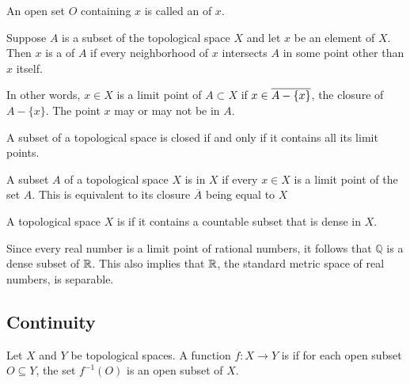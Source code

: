 \begin{definition}
An open set $O$ containing $x$ is called an  of $x$.
\end{definition}

\begin{definition}
Suppose $A$ is a subset of the topological space $X$ and let $x$ be an element of $X$.
Then $x$ is a  of $A$ if every neighborhood of $x$ intersects $A$ in some point other than $x$ itself.
\end{definition}

In other words, $x \in X$ is a limit point of $A \subset X$ if $x \in \overline{A - \{ x \}}$, the closure of $A - \{ x \}$.
The point $x$ may or may not be in $A$.

\begin{theorem}
A subset of a topological space is closed if and only if it contains all its limit points.
\end{theorem}

\begin{definition}
A subset $A$ of a topological space $X$ is  in $X$ if every $x\in X$ is a limit point of the set $A$.
This is equivalent to its closure $\overline{A}$ being equal to $X$
\end{definition}

\begin{definition}
A topological space $X$ is  if it contains a countable subset that is dense in $X$.
\end{definition}

\begin{example}
Since every real number is a limit point of rational numbers, it follows that $\mathbb{Q}$ is a dense subset of $\mathbb{R}$.
This also implies that $\mathbb{R}$, the standard metric space of real numbers, is separable.
\end{example}


\subsection{Continuity}

\begin{definition}
Let $X$ and $Y$ be topological spaces.
A function $f: X \rightarrow Y$ is  if for each open subset $O \subseteq Y$, the set $f^{-1} (O)$ is an open subset of $X$.
\end{definition}

